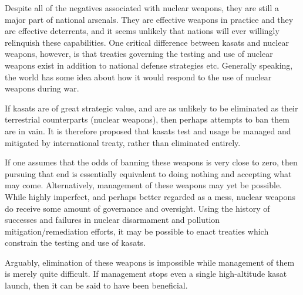 Despite all of the negatives associated with nuclear weapons, they are
still a major part of national arsenals.  They are effective weapons
in practice\cite[hiroshima]{xxx} and they are effective
deterrents\cite[mad]{xxx}, and it seems unlikely that nations will
ever willingly relinquish these capabilities.  One critical difference
between \acp{kasat} and nuclear weapons, however, is that treaties
governing the testing and use of nuclear weapons exist in addition to
national defense strategies etc.  Generally speaking, the world has
some idea about how it would respond to the use of nuclear weapons
during war.  \cite[biden's statement]{xxx}

If \acp{kasat} are of great strategic value, and are as unlikely to be
eliminated as their terrestrial counterparts (nuclear weapons), then
perhaps attempts to ban them are in vain.  It is therefore proposed
that \acp{kasat} test and usage be managed and mitigated by
international treaty, rather than eliminated entirely.

If one assumes that the odds of banning these weapons is very close to
zero, then pursuing that end is essentially equivalent to doing
nothing and accepting what may come.  Alternatively, management of
these weapons may yet be possible.  While highly imperfect, and
perhaps better regarded as a mess, nuclear weapons do receive some
amount of governance and oversight.  Using the history of successes
and failures in nuclear disarmament and pollution
mitigation/remediation efforts, it may be possible to enact treaties
which constrain the testing and use of \acp{kasat}.

Arguably, elimination of these weapons is impossible while management
of them is merely quite difficult.  If management stops even a single
high-altitude \ac{kasat} launch, then it can be said to have been
beneficial.
